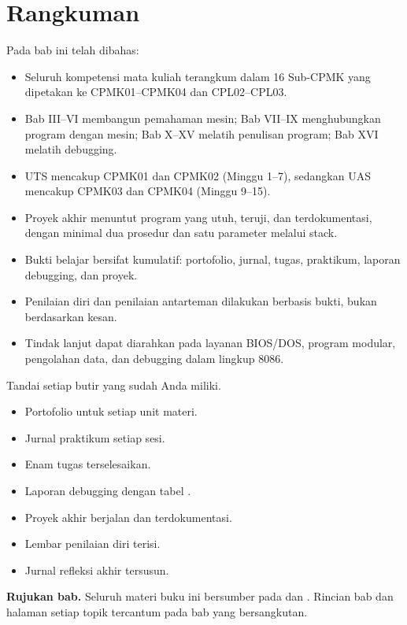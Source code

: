 \section{Rangkuman}
\label{sec:rangkuman-bab17}

Pada bab ini telah dibahas:

\begin{itemize}
    \item Seluruh kompetensi mata kuliah terangkum dalam 16
          Sub-CPMK yang dipetakan ke CPMK01--CPMK04 dan CPL02--CPL03.

    \item Bab III--VI membangun pemahaman mesin; Bab VII--IX
          menghubungkan program dengan mesin; Bab X--XV melatih
          penulisan program; Bab XVI melatih debugging.

    \item UTS mencakup CPMK01 dan CPMK02 (Minggu 1--7), sedangkan
          UAS mencakup CPMK03 dan CPMK04 (Minggu 9--15).

    \item Proyek akhir menuntut program yang utuh, teruji, dan
          terdokumentasi, dengan minimal dua prosedur dan satu
          parameter melalui stack.

    \item Bukti belajar bersifat kumulatif: portofolio, jurnal,
          tugas, praktikum, laporan debugging, dan proyek.

    \item Penilaian diri dan penilaian antarteman dilakukan berbasis
          bukti, bukan berdasarkan kesan.

    \item Tindak lanjut dapat diarahkan pada layanan BIOS/DOS,
          program modular, pengolahan data, dan debugging dalam
          lingkup 8086.
\end{itemize}

\begin{checklistbox}
\vspace{1.1em}
Tandai setiap butir yang sudah Anda miliki.

\begin{itemize}
    \item[\checkbox] Portofolio  untuk setiap unit materi.
    \item[\checkbox] Jurnal praktikum setiap sesi.
    \item[\checkbox] Enam tugas terselesaikan.
    \item[\checkbox] Laporan debugging dengan tabel .
    \item[\checkbox] Proyek akhir berjalan dan terdokumentasi.
    \item[\checkbox] Lembar penilaian diri terisi.
    \item[\checkbox] Jurnal refleksi akhir tersusun.
\end{itemize}
\end{checklistbox}

\begin{infobox}
\vspace{1.1em}
\textbf{Rujukan bab.} Seluruh materi buku ini bersumber pada
\cite{gunawan2019} dan \cite{sto2001}. Rincian bab dan halaman setiap
topik tercantum pada bab yang bersangkutan.
\end{infobox}
